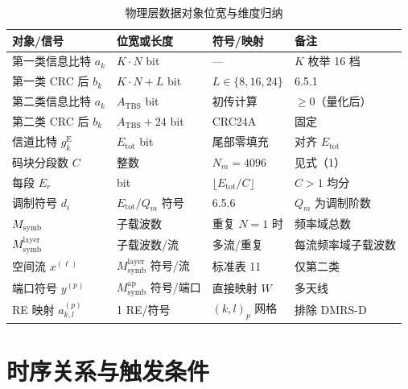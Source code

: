\documentclass[11pt,a4paper]{ctexart}
\begin{document}
\begin{table}[h]
\centering
\small
\caption{物理层数据对象位宽与维度归纳}
\begin{tabular}{L{4cm}L{3.5cm}L{3.5cm}L{2.5cm}}
\toprule
\textbf{对象/信号} & \textbf{位宽或长度} & \textbf{符号/映射} & \textbf{备注} \\
\midrule
第一类信息比特 $a_k$ & $K \cdot N$ bit & --- & $K$ 枚举 16 档 \\
第一类 CRC 后 $b_k$ & $K \cdot N + L$ bit & $L \in \{8,16,24\}$ & 6.5.1 \\
第二类信息比特 $a_k$ & $A_{\mathrm{TBS}}$ bit & 初传计算 & $\geq 0$（量化后） \\
第二类 CRC 后 $b_k$ & $A_{\mathrm{TBS}} + 24$ bit & CRC24A & 固定 \\
信道比特 $g^{\mathrm{E}}_k$ & $E_{\mathrm{tot}}$ bit & 尾部零填充 & 对齐 $E_{\mathrm{tot}}$ \\
码块分段数 $C$ & 整数 & $N_m=4096$ & 见式（1） \\
每段 $E_r$ & bit & $\lfloor E_{\mathrm{tot}}/C \rfloor$ & $C>1$ 均分 \\
调制符号 $d_i$ & $E_{\mathrm{tot}}/Q_m$ 符号 & 6.5.6 & $Q_m$ 为调制阶数 \\
$M_{\mathrm{symb}}$ & 子载波数 & 重复 $N{=}1$ 时 & 频率域总数 \\
$M_{\mathrm{symb}}^{\mathrm{layer}}$ & 子载波数/流 & 多流/重复 & 每流频率域子载波数 \\
空间流 $x^{(\ell)}$ & $M_{\mathrm{symb}}^{\mathrm{layer}}$ 符号/流 & 标准表 11 & 仅第二类 \\
端口符号 $y^{(p)}$ & $M_{\mathrm{symb}}^{\mathrm{ap}}$ 符号/端口 & 直接映射 $W$ & 多天线 \\
RE 映射 $a_{k,l}^{(p)}$ & 1 RE/符号 & $(k,l)_p$ 网格 & 排除 DMRS-D \\
\bottomrule
\end{tabular}
\end{table}

\section{时序关系与触发条件}
\end{document}
